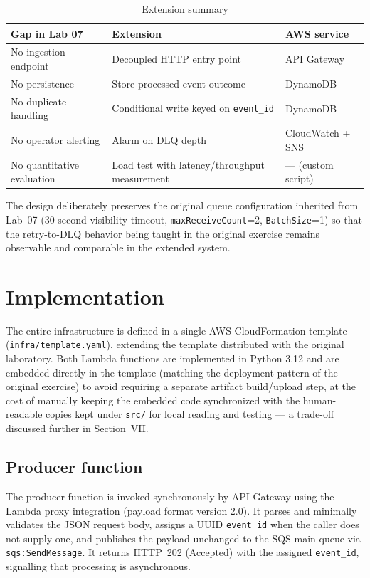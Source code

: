 \documentclass[conference]{IEEEtran}
\begin{document}
\begin{table}[htbp]
\caption{Extension summary}
\label{tab:extension}
\centering
\begin{tabular}{p{2.6cm}p{2.6cm}p{2.2cm}}
\toprule
\textbf{Gap in Lab 07} & \textbf{Extension} & \textbf{AWS service} \\
\midrule
No ingestion endpoint & Decoupled HTTP entry point & API Gateway \\
No persistence & Store processed event outcome & DynamoDB \\
No duplicate handling & Conditional write keyed on \texttt{event\_id} & DynamoDB \\
No operator alerting & Alarm on DLQ depth & CloudWatch + SNS \\
No quantitative evaluation & Load test with latency/throughput measurement & --- (custom script) \\
\bottomrule
\end{tabular}
\end{table}

The design deliberately preserves the original queue configuration inherited from Lab~07 (30-second visibility timeout, \texttt{maxReceiveCount}=2, \texttt{BatchSize}=1) so that the retry-to-DLQ behavior being taught in the original exercise remains observable and comparable in the extended system.

\section{Implementation}

The entire infrastructure is defined in a single AWS CloudFormation template (\texttt{infra/template.yaml}), extending the template distributed with the original laboratory. Both Lambda functions are implemented in Python 3.12 and are embedded directly in the template (matching the deployment pattern of the original exercise) to avoid requiring a separate artifact build/upload step, at the cost of manually keeping the embedded code synchronized with the human-readable copies kept under \texttt{src/} for local reading and testing --- a trade-off discussed further in Section~VII.

\subsection{Producer function}
The producer function is invoked synchronously by API Gateway using the Lambda proxy integration (payload format version 2.0). It parses and minimally validates the JSON request body, assigns a UUID \texttt{event\_id} when the caller does not supply one, and publishes the payload unchanged to the SQS main queue via \texttt{sqs:SendMessage}. It returns HTTP~202 (Accepted) with the assigned \texttt{event\_id}, signalling that processing is asynchronous.
\end{document}
